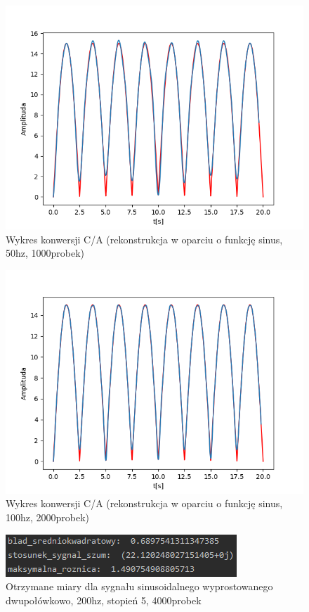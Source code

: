 \documentclass[12pt]{article}
\begin{document}
\begin{figure}[H]
\centering
\includegraphics[scale=0.6]{122sygsinusDwuSin50czest.png}
\caption{Wykres konwersji C/A (rekonstrukcja w oparciu o funkcję sinus, 50hz, 1000probek)}
\end{figure}

\begin{figure}[H]
\centering
\includegraphics[scale=0.6]{12sygsinusDwuSin100czest.png}
\caption{Wykres konwersji C/A (rekonstrukcja w oparciu o funkcję sinus, 100hz, 2000probek)}
\end{figure}

\begin{figure}[H]
\centering
\includegraphics[scale=0.9]{444sinusDwuMiarySt5.png}
\caption{Otrzymane miary dla sygnału sinusoidalnego wyprostowanego dwupołówkowo, 200hz, stopień 5, 4000probek}
\end{figure}
\end{document}
